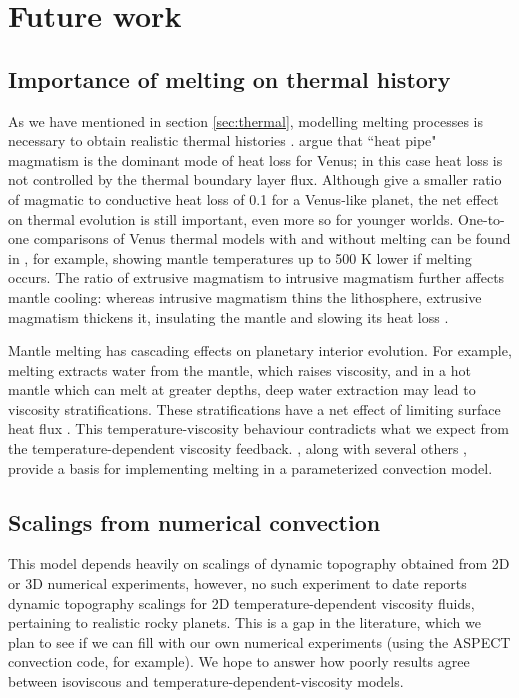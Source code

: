 \section{Future work}

\subsection{Importance of melting on thermal history}\label{sec:melting}

As we have mentioned in section \ref{sec:thermal}, modelling melting processes is necessary to obtain realistic thermal histories \citep{Nakagawa2012}. \citet{Armann2012} argue that ``heat pipe" magmatism is the dominant mode of heat loss for Venus; in this case heat loss is not controlled by the thermal boundary layer flux. Although \citet{Kite2009} give a smaller ratio of magmatic to conductive heat loss of 0.1 for a Venus-like planet, the net effect on thermal evolution is still important, even more so for younger worlds. One-to-one comparisons of Venus thermal models with and without melting can be found in \citet{Driscoll2014}, for example, showing mantle temperatures up to 500 K lower if melting occurs. The ratio of extrusive magmatism to intrusive magmatism further affects mantle cooling: whereas intrusive magmatism thins the lithosphere, extrusive magmatism thickens it, insulating the mantle and slowing its heat loss \citep{Lourenco2018}.

Mantle melting has cascading effects on planetary interior evolution. For example, melting extracts water from the mantle, which raises viscosity, and in a hot mantle which can melt at greater depths, deep water extraction may lead to viscosity stratifications. These stratifications have a net effect of limiting surface heat flux \citep{Korenaga2009}. This temperature-viscosity behaviour contradicts what we expect from the temperature-dependent viscosity feedback. \citet{Korenaga2009}, along with several others \citep{Kite2009, Driscoll2014, Tosi2017, Foley2018}, provide a basis for implementing melting in a parameterized convection model.

\subsection{Scalings from numerical convection}

This model depends heavily on scalings of dynamic topography obtained from 2D or 3D numerical experiments, however, no such experiment to date reports dynamic topography scalings for 2D temperature-dependent viscosity fluids, pertaining to realistic rocky planets. This is a gap in the literature, which we plan to see if we can fill with our own numerical experiments (using the ASPECT convection code, for example). We hope to answer how poorly results agree between isoviscous and temperature-dependent-viscosity models.

